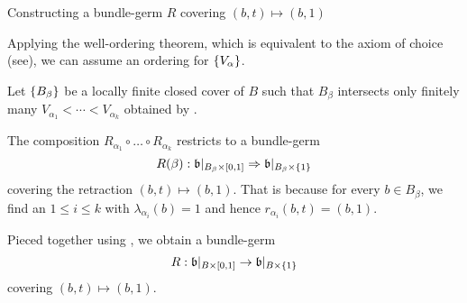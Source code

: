 \begin{scope}
\begin{myproof}
\begin{sectionize}
            \item Constructing a bundle-germ $R$ covering $(b, t) \mapsto (b, 1)$

            Applying the well-ordering theorem,
            which is equivalent to the axiom of choice (see\cite[p.14]{kuczma}),
            we can assume an ordering for $\{V_\alpha\}$.

            Let $\{B_\beta\}$ be a locally finite closed cover of $B$
            such that $B_\beta$ intersects only
            finitely many $V_{\alpha_1} < \cdots < V_{\alpha_k}$
            obtained by .

            The composition
            $R_{\alpha_1} \circ \ldots \circ R_{\alpha_k}$ restricts to a bundle-germ 
            \[ \germdef{R(\beta)}{\bb[\cyl{B_\beta}]}{\bb[\cylup{B_\beta}]} \]
            covering the retraction $(b, t) \mapsto (b, 1)$.
            That is because for every $b \in B_\beta$,
            we find an $1 \le i \le k$ with
            $\lambda_{\alpha_i}(b) = 1$ and hence $r_{\alpha_i}(b, t) = (b, 1)$.
            
            Pieced together using ,
            we obtain a bundle-germ
            \[ R: \bb[\cyl{B}] \to \bb[\cylup{B}] \]
            covering $(b, t) \mapsto (b, 1)$.
        \end{sectionize}    
    \end{myproof}
\end{scope}